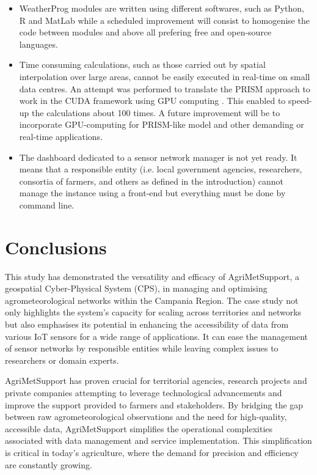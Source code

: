 \documentclass[authoryear,preprint,review,12pt]{elsarticle}
\newcommand{\statusblock}[3]{
    \ifthenelse{\equal{#2}{todo}}
        {\textcolor{red}{#1 (TO DO): #3}}
        {}
    \ifthenelse{\equal{#2}{wip}}
        {\textcolor{magenta}{#1 (IN PROGRESS): #3}}
        {}
    \ifthenelse{\equal{#2}{update}}
        {\textcolor{blue}{#1 (UPDATE): #3}}
        {}
    \ifthenelse{\equal{#2}{review}}
        {\textcolor{cyan}{#1 (REVIEW): #3}}
        {}
    \ifthenelse{\equal{#2}{done}}
        {\textcolor{PineGreen}{#1 (READY): #3}}
        {}
}
\begin{document}
\begin{itemize}
    \item WeatherProg modules are written using different softwares, such as Python, R and MatLab while a scheduled improvement will consist to homogenise the code between modules and above all prefering free and open-source languages.

    \item Time consuming calculations, such as those carried out by spatial interpolation over large areas, cannot be easily executed in real-time on small data centres. 
    An attempt was performed to translate the PRISM approach to work in the CUDA framework using GPU computing \citep{gPRISM_CUDA_proceedings}.
    This enabled to speed-up the calculations about 100 times.
    A future improvement will be to incorporate GPU-computing for PRISM-like model and other demanding or real-time applications.

    \item The dashboard dedicated to a sensor network manager is not yet ready. It means that a responsible entity (i.e. local government agencies, researchers, consortia of farmers, and others as defined in the introduction) cannot manage the instance using a front-end but everything must be done by command line.
\end{itemize}

\section{Conclusions}
This study has demonstrated the versatility and efficacy of AgriMetSupport, a geospatial Cyber-Physical System (CPS), in managing and optimising agrometeorological networks within the Campania Region.
The case study not only highlights the system's capacity for scaling across territories and networks but also emphasises its potential in enhancing the accessibility of data from various IoT sensors for a wide range of applications.
It can ease the management of sensor networks by responsible entities while leaving complex issues to researchers or domain experts.

AgriMetSupport has proven crucial 
for territorial agencies, research pro\-jects and private companies attempting
to leverage technological advancements and improve the support provided to farmers and stakeholders. 
By bridging the gap between raw agrometeorological observations and the need for high-quality, accessible data, AgriMetSupport simplifies the operational complexities associated with data management and service implementation. 
This simplification is critical in today's agriculture, where the demand for precision and efficiency are constantly growing.
\end{document}
